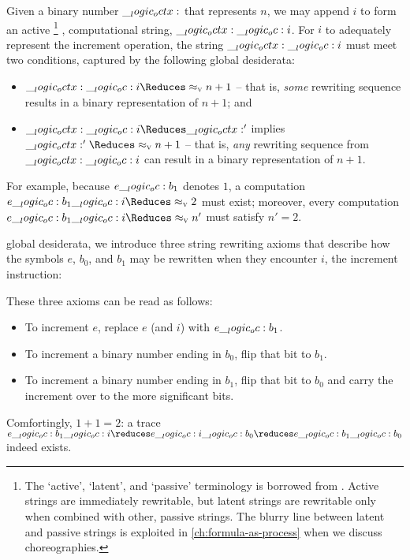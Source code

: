 Given a binary number $\__logic_octx:$ that represents $n$, we may append $i$ to form an active%
\footnote{The \enquote*{active}, \enquote*{latent}, and \enquote*{passive} terminology is borrowed from \textcite{Pfenning+Simmons:LICS09}.
  Active strings are immediately rewritable, but latent strings are rewritable only when combined with other, passive strings.
  The blurry line between latent and passive strings is exploited in \cref{ch:formula-as-process} when we discuss choreographies.}%
, computational string, $\__logic_octx: \__logic_oc: i$.
For $i$ to adequately represent the increment operation, the string $\__logic_octx: \__logic_oc: i$ must meet two conditions, captured by the following global desiderata:
  \begin{itemize}%
  \item
    $\octx \oc i \Reduces\aval{}{n+1}$ -- that is, \emph{some} rewriting sequence results in a binary representation of $n+1$; and
  \item
    $\octx \oc i \Reduces \octx'$ implies $\octx' \Reduces\aval{}{n+1}$ -- that is, \emph{any} rewriting sequence from $\__logic_octx: \__logic_oc: i$ can result in a binary representation of $n+1$.
  \end{itemize}
For example, because $e \__logic_oc: b_1$ denotes $1$, a computation $e \oc b_1 \oc i \Reduces\aval{}{2}$ must exist; moreover, every computation $e \oc b_1 \oc i \Reduces\aval{}{n'}$ must satisfy $n' = 2$.

 global desiderata, we introduce three string rewriting axioms that describe how the symbols $e$, $b_0$, and $b_1$ may be rewritten when they encounter $i$, the increment instruction:
These three axioms can be read as follows:
\begin{itemize}
\item
  To increment $e$, replace $e$ (and $i$) with $e \__logic_oc: b_1$.
\item
  To increment a binary number ending in $b_0$, flip that bit to $b_1$.
\item
  To increment a binary number ending in $b_1$, flip that bit to $b_0$ and carry the increment over to the more significant bits.
\end{itemize}
Comfortingly, $1+1 = 2$: a trace $e \oc b_1 \oc i \reduces e \oc i \oc b_0 \reduces e \oc b_1 \oc b_0$ indeed exists.

